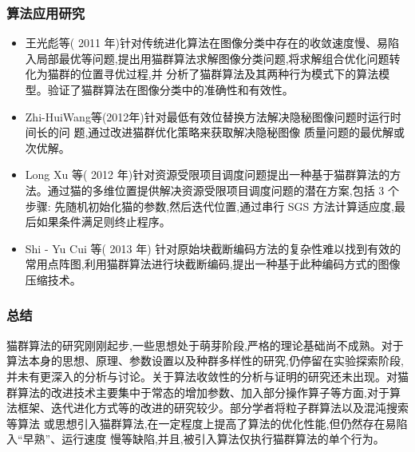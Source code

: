 \begin{frame}
	\frametitle{算法应用研究}
		\begin{itemize}
					\item {王光彪等( 2011 年)针对传统进化算法在图像分类中存在的收敛速度慢、易陷入局部最优等问题,提出用猫群算法求解图像分类问题,将求解组合优化问题转化为猫群的位置寻优过程,并 分析了猫群算法及其两种行为模式下的算法模型。验证了猫群算法在图像分类中的准确性和有效性。}
					\item {Zhi-HuiWang等(2012年)针对最低有效位替换方法解决隐秘图像问题时运行时间长的问 题,通过改进猫群优化策略来获取解决隐秘图像 质量问题的最优解或次优解。}
					\item {Long Xu 等( 2012 年)针对资源受限项目调度问题提出一种基于猫群算法的方法。通过猫的多维位置提供解决资源受限项目调度问题的潜在方案,包括 3 个步骤: 先随机初始化猫的参数,然后迭代位置,通过串行 SGS 方法计算适应度,最后如果条件满足则终止程序。}
					\item {Shi - Yu Cui 等( 2013 年) 针对原始块截断编码方法的复杂性难以找到有效的常用点阵图,利用猫群算法进行块截断编码,提出一种基于此种编码方式的图像压缩技术。}
		
		\end{itemize}

\end{frame}

\begin{frame}
	\frametitle{总结}
	猫群算法的研究刚刚起步,一些思想处于萌芽阶段,严格的理论基础尚不成熟。对于算法本身的思想、原理、参数设置以及种群多样性的研究,仍停留在实验探索阶段,并未有更深入的分析与讨论。关于算法收敛性的分析与证明的研究还未出现。对猫群算法的改进技术主要集中于常态的增加参数、加入部分操作算子等方面,对于算法框架、迭代进化方式等的改进的研究较少。部分学者将粒子群算法以及混沌搜索等算法 或思想引入猫群算法,在一定程度上提高了算法的优化性能,但仍然存在易陷入“早熟”、运行速度 慢等缺陷,并且,被引入算法仅执行猫群算法的单个行为。

\end{frame}